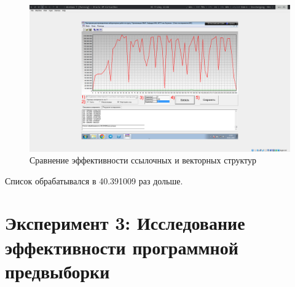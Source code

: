 \documentclass[a4paper,oneside,14pt]{extarticle}
\begin{document}
\begin{figure}[H]
	\centering
	\includegraphics[width=1\textwidth]{img/2.png}
    \caption{Сравнение эффективности ссылочных и векторных структур}
	\label{fig:2}
\end{figure}

Список обрабатывался в 40.391009 раз дольше.







\newpage

\section{Эксперимент 3: Исследование эффективности программной предвыборки}
\end{document}
